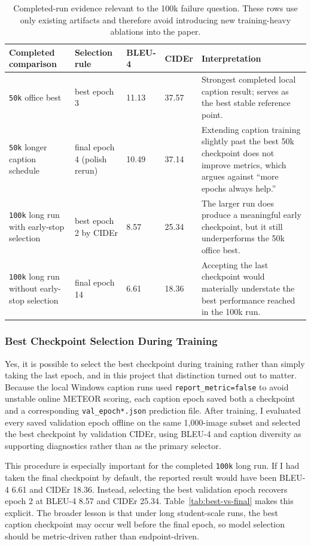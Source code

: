 \documentclass[11pt]{article}
\begin{document}
\begin{table}[t]
\centering
\small
\begin{tabularx}{\textwidth}{p{3.2cm} p{2.2cm} p{1.3cm} p{1.3cm} Y}
\toprule
Completed comparison & Selection rule & BLEU-4 & CIDEr & Interpretation \\
\midrule
\texttt{50k} office best & best epoch 3 & 11.13 & 37.57 & Strongest completed local caption result; serves as the best stable reference point. \\
\texttt{50k} longer caption schedule & final epoch 4 (polish rerun) & 10.49 & 37.14 & Extending caption training slightly past the best 50k checkpoint does not improve metrics, which argues against ``more epochs always help.'' \\
\texttt{100k} long run with early-stop selection & best epoch 2 by CIDEr & 8.57 & 25.34 & The larger run does produce a meaningful early checkpoint, but it still underperforms the 50k office best. \\
\texttt{100k} long run without early-stop selection & final epoch 14 & 6.61 & 18.36 & Accepting the last checkpoint would materially understate the best performance reached in the 100k run. \\
\bottomrule
\end{tabularx}
\caption{Completed-run evidence relevant to the 100k failure question. These rows use only existing artifacts and therefore avoid introducing new training-heavy ablations into the paper.}
\label{tab:failure-evidence}
\end{table}

\subsubsection{Best Checkpoint Selection During Training}
Yes, it is possible to select the best checkpoint during training rather than simply taking the last epoch, and in this project that distinction turned out to matter. Because the local Windows caption runs used \texttt{report\_metric=false} to avoid unstable online METEOR scoring, each caption epoch saved both a checkpoint and a corresponding \texttt{val\_epoch*.json} prediction file. After training, I evaluated every saved validation epoch offline on the same 1,000-image subset and selected the best checkpoint by validation CIDEr, using BLEU-4 and caption diversity as supporting diagnostics rather than as the primary selector.

This procedure is especially important for the completed \texttt{100k} long run. If I had taken the final checkpoint by default, the reported result would have been BLEU-4 6.61 and CIDEr 18.36. Instead, selecting the best validation epoch recovers epoch 2 at BLEU-4 8.57 and CIDEr 25.34. Table~\ref{tab:best-vs-final} makes this explicit. The broader lesson is that under long student-scale runs, the best caption checkpoint may occur well before the final epoch, so model selection should be metric-driven rather than endpoint-driven.
\end{document}
